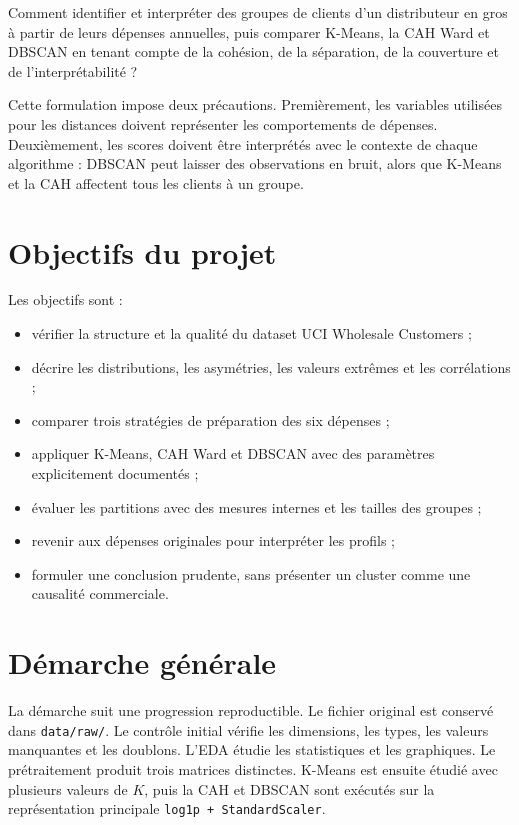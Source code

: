 \begin{pedagogie}
Comment identifier et interpréter des groupes de clients d'un distributeur en gros à partir de leurs dépenses annuelles, puis comparer K-Means, la CAH Ward et DBSCAN en tenant compte de la cohésion, de la séparation, de la couverture et de l'interprétabilité ?
\end{pedagogie}

Cette formulation impose deux précautions. Premièrement, les variables utilisées pour les distances doivent représenter les comportements de dépenses. Deuxièmement, les scores doivent être interprétés avec le contexte de chaque algorithme : DBSCAN peut laisser des observations en bruit, alors que K-Means et la CAH affectent tous les clients à un groupe.

\section{Objectifs du projet}
Les objectifs sont :
\begin{itemize}
  \item vérifier la structure et la qualité du dataset UCI Wholesale Customers ;
  \item décrire les distributions, les asymétries, les valeurs extrêmes et les corrélations ;
  \item comparer trois stratégies de préparation des six dépenses ;
  \item appliquer K-Means, CAH Ward et DBSCAN avec des paramètres explicitement documentés ;
  \item évaluer les partitions avec des mesures internes et les tailles des groupes ;
  \item revenir aux dépenses originales pour interpréter les profils ;
  \item formuler une conclusion prudente, sans présenter un cluster comme une causalité commerciale.
\end{itemize}

\section{Démarche générale}
La démarche suit une progression reproductible. Le fichier original est conservé dans \texttt{data/raw/}. Le contrôle initial vérifie les dimensions, les types, les valeurs manquantes et les doublons. L'EDA étudie les statistiques et les graphiques. Le prétraitement produit trois matrices distinctes. K-Means est ensuite étudié avec plusieurs valeurs de $K$, puis la CAH et DBSCAN sont exécutés sur la représentation principale \texttt{log1p + StandardScaler}.

